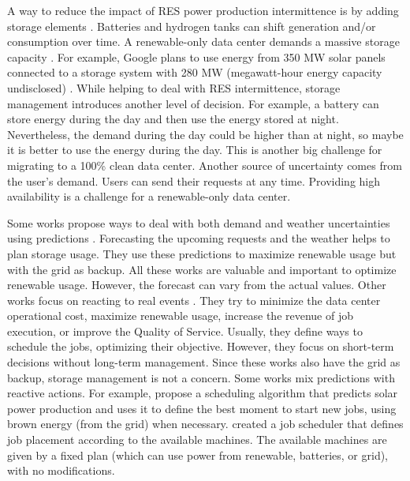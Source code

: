 A way to reduce the impact of RES power production intermittence is by adding storage elements \cite{rostirolla2022survey}. Batteries and hydrogen tanks can shift generation and/or consumption over time. A renewable-only data center demands a massive storage capacity \cite{rostirolla2022survey}. For example, Google plans to use energy from 350 MW solar panels connected to a storage system with 280 MW (megawatt-hour energy capacity undisclosed) \cite{branscombe2020google}. While helping to deal with RES intermittence, storage management introduces another level of decision. For example, a battery can store energy during the day and then use the energy stored at night. Nevertheless, the demand during the day could be higher than at night, so maybe it is better to use the energy during the day. This is another big challenge for migrating to a 100\% clean data center. Another source of uncertainty comes from the user's demand. Users can send their requests at any time. Providing high availability is a challenge for a renewable-only data center.

Some works propose ways to deal with both demand and weather uncertainties using predictions \cite{wiesner2022cucumber, haddad2019mixed, lu_energy-efficient_2018, goiri2015matching}. Forecasting the upcoming requests and the weather helps to plan storage usage. They use these predictions to maximize renewable usage but with the grid as backup. All these works are valuable and important to optimize renewable usage. However, the forecast can vary from the actual values. Other works focus on reacting to real events \cite{liu2023online, he2022online, caux2019phase, sharma2011blink}. They try to minimize the data center operational cost, maximize renewable usage, increase the revenue of job execution, or improve the Quality of Service. Usually, they define ways to schedule the jobs, optimizing their objective. However, they focus on short-term decisions without long-term management. Since these works also have the grid as backup, storage management is not a concern. Some works mix predictions with reactive actions. For example, \citeauthor{goiri2015matching} \cite{goiri2015matching} propose a scheduling algorithm that predicts solar power production and uses it to define the best moment to start new jobs, using brown energy (from the grid) when necessary. \citeauthor{venkataswamy2023rare} \cite{venkataswamy2023rare} created a job scheduler that defines job placement according to the available machines. The available machines are given by a fixed plan (which can use power from renewable, batteries, or grid), with no modifications.

